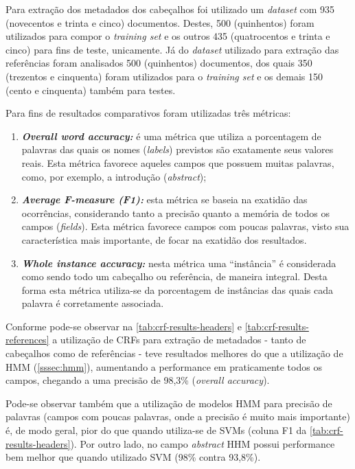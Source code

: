 Para extração dos metadados dos cabeçalhos foi utilizado um \emph{dataset} com 935 (novecentos e trinta e cinco) documentos. Destes, 500 (quinhentos) foram utilizados para compor o \emph{training set} e os outros 435 (quatrocentos e trinta e cinco) para fins de teste, unicamente. Já do \emph{dataset} utilizado para extração das referências foram analisados 500 (quinhentos) documentos, dos quais 350 (trezentos e cinquenta) foram utilizados para o \emph{training set} e os demais 150 (cento e cinquenta) também para testes.

Para fins de resultados comparativos foram utilizadas três métricas:

\begin{enumerate}

    \item \emph{\textbf{Overall word accuracy:}} é uma métrica que utiliza a porcentagem de palavras das quais os nomes (\emph{labels}) previstos são exatamente seus valores reais. Esta métrica favorece aqueles campos que possuem muitas palavras, como, por exemplo, a introdução (\emph{abstract});

    \item \emph{\textbf{Average F-measure (F1):}} esta métrica se baseia na exatidão das ocorrências, considerando tanto a precisão quanto a memória de todos os campos (\emph{fields}). Esta métrica favorece campos com poucas palavras, visto sua característica mais importante, de focar na exatidão dos resultados.
    
    \item \emph{\textbf{Whole instance accuracy:}} nesta métrica uma ``instância'' é considerada como sendo todo um cabeçalho ou referência, de maneira integral. Desta forma esta métrica utiliza-se da porcentagem de instâncias das quais cada palavra é corretamente associada.

\end{enumerate}

Conforme pode-se observar na \autoref{tab:crf-results-headers} e \autoref{tab:crf-results-references} a utilização de CRFs para extração de metadados - tanto de cabeçalhos como de referências - teve resultados melhores do que a utilização de HMM (\autoref{sssec:hmm}), aumentando a performance em praticamente todos os campos, chegando a uma precisão de 98,3\% (\emph{overall accuracy}).

Pode-se observar também que a utilização de modelos HMM para precisão de palavras (campos com poucas palavras, onde a precisão é muito mais importante) é, de modo geral, pior do que quando utiliza-se de SVMs (coluna F1 da \autoref{tab:crf-results-headers}). Por outro lado, no campo \emph{abstract} HHM possui performance bem melhor que quando utilizado SVM (98\% contra 93,8\%).


